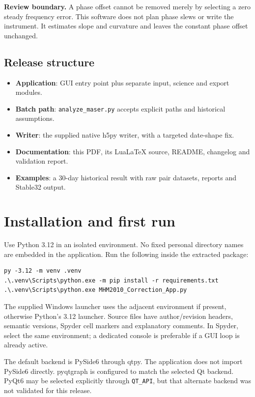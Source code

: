 \documentclass[11pt,a4paper]{article}
\newcommand{\warning}[1]{\par\noindent\colorbox{light}{\parbox{\dimexpr\linewidth-2\fboxsep}{\textbf{Review boundary.} #1}}\par}
\begin{document}
\warning{A phase offset cannot be removed merely by selecting a zero steady
frequency error. This software does not plan phase slews or write the
instrument. It estimates slope and curvature and leaves the constant phase
offset unchanged.}

\subsection{Release structure}
\begin{itemize}
\item \textbf{Application}: GUI entry point plus separate input, science and export modules.
\item \textbf{Batch path}: \texttt{analyze\_maser.py} accepts explicit paths and historical assumptions.
\item \textbf{Writer}: the supplied native h5py writer, with a targeted date-shape fix.
\item \textbf{Documentation}: this PDF, its LuaLaTeX source, README, changelog and validation report.
\item \textbf{Examples}: a 30-day historical result with raw pair datasets, reports and Stable32 output.
\end{itemize}
\clearpage

\section{Installation and first run}
Use Python 3.12 in an isolated environment. No fixed personal directory names
are embedded in the application. Run the following inside the extracted package:
\begin{lstlisting}
py -3.12 -m venv .venv
.\.venv\Scripts\python.exe -m pip install -r requirements.txt
.\.venv\Scripts\python.exe MHM2010_Correction_App.py
\end{lstlisting}

The supplied Windows launcher uses the adjacent environment if present,
otherwise Python's 3.12 launcher. Source files have author/revision headers,
semantic versions, Spyder cell markers and explanatory comments. In Spyder,
select the same environment; a dedicated console is preferable if a GUI loop
is already active.

The default backend is PySide6 through qtpy. The application does not import
PySide6 directly. pyqtgraph is configured to match the selected Qt backend.
PyQt6 may be selected explicitly through \texttt{QT\_API}, but that alternate
backend was not validated for this release.
\end{document}
